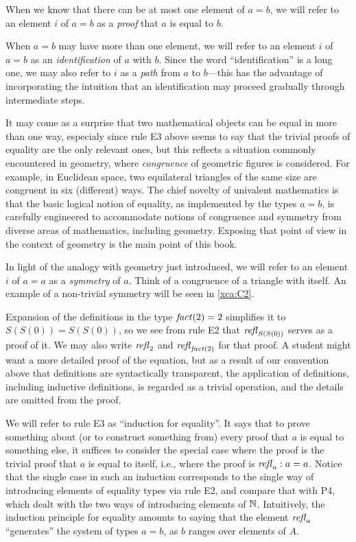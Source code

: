 When we know that there can be at most one element of $a=b$, we will refer to an element $i$ of $a=b$ as a {\em proof} that $a$ is equal to $b$.

When $a=b$ may have more than one element, we will refer to an element $i$ of $a=b$ as an {\em identification} of $a$ with $b$.  Since the word
``identification'' is a long one, we may also refer to $i$ as a {\em path} from $a$ to $b$---this has the advantage of incorporating the
intuition that an identification may proceed gradually through intermediate steps.

It may come as a surprise that two mathematical objects can be equal in more than one way, especialy since rule E3 above seems to say that the
trivial proofs of equality are the only relevant ones, but this reflects a situation commonly encountered in geometry, where {\em congruence} of
geometric figures is considered.  For example, in Euclidean space, two equilateral triangles of the same size are congruent in six (different)
ways.  The chief novelty of univalent mathematics is that the basic logical notion of equality, as implemented by the types $a=b$, is carefully
engineered to accommodate notions of congruence and symmetry from diverse areas of mathematics, including geometry.  Exposing that point of view
in the context of geometry is the main point of this book.

In light of the analogy with geometry just introduced, we will refer to an element $i$ of $a=a$ as a {\em symmetry} of $a$.  Think of a
congruence of a triangle with itself.  An example of a non-trivial symmetry will be seen in \cref{xca:C2}.

Expansion of the definitions in the type $\mathop{\mathit{fact}}(2)=2$ simplifies it to $S(S(0)) = S(S(0))$, so we see from rule E2 that $\mathop{{\it refl}_{S(S(0))}}$ serves
as a proof of it.  We may also write $\mathop{{\it refl}_{2}}$ and $\mathop{{\it refl}_{\mathop{\mathit{fact}}(2)}}$ for that proof.  A student might want a more detailed proof of the
equation, but as a result of our convention above that definitions are syntactically transparent, the application of definitions, including
inductive definitions, is regarded as a trivial operation, and the details are omitted from the proof.

We will refer to rule E3 as ``induction for equality''.  It says that to prove something about (or to construct something from) every proof that
$a$ is equal to something else, it suffices to consider the special case where the proof is the trivial proof that $a$ is equal to itself, i.e.,
where the proof is $\mathop{{\it refl}_{a}} : a=a$.  Notice that the single case in such an induction corresponds to the single way of introducing elements of
equality types via rule E2, and compare that with P4, which dealt with the two ways of introducing elements of $\mathbb{N}$.
Intuitively, the induction principle for equality amounts to saying that the element $\mathop{{\it refl}_{a}}$ ``generates'' the system of types $a=b$, as $b$
ranges over elements of $A$.

